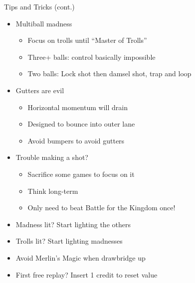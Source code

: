 \documentclass{beamer}
\begin{document}
\begin{frame}{Tips and Tricks (cont.)}
\begin{itemize}
	\item Multiball madness
	\begin{itemize}
		\item Focus on trolls until ``Master of Trolls''
		\item Three+ balls: control basically impossible
		\item Two balls: Lock shot then damsel shot, trap and loop
	\end{itemize}
	\item Gutters are evil
	\begin{itemize}
		\item Horizontal momentum will drain
		\item Designed to bounce into outer lane
		\item Avoid bumpers to avoid gutters
	\end{itemize}
	\item Trouble making a shot?
	\begin{itemize}
		\item Sacrifice some games to focus on it
		\item Think long-term
		\item Only need to beat Battle for the Kingdom once!
	\end{itemize}
	\item Madness lit?  Start lighting the others
	\item Trolls lit?  Start lighting madnesses
	\item Avoid Merlin's Magic when drawbridge up
	\item First free replay?  Insert 1 credit to reset value
\end{itemize}
\end{frame}
\end{document}
